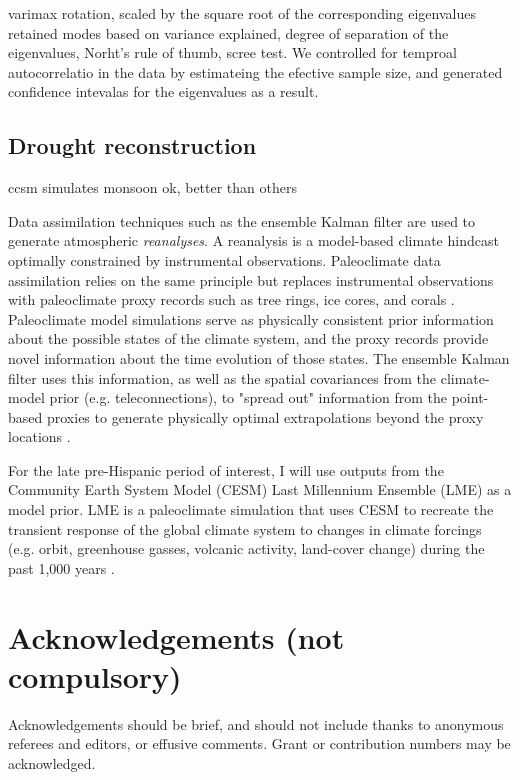 \documentclass[fleqn,10pt]{wlscirep}
\begin{document}
varimax rotation, scaled by the square root of the corresponding eigenvalues
retained modes based on variance explained, degree of separation of the eigenvalues, Norht's rule of thumb, scree test. We controlled for temproal autocorrelatio in the data by estimateing the efective sample size, and generated confidence intevalas for the eigenvalues as a result.

\subsection*{Drought reconstruction}
ccsm simulates monsoon ok, better than others

Data assimilation techniques such as the ensemble Kalman filter are used to generate atmospheric \textit{reanalyses}. A reanalysis is a model-based climate hindcast optimally constrained by instrumental observations. Paleoclimate data assimilation relies on the same principle but replaces instrumental observations with paleoclimate proxy records such as tree rings, ice cores, and corals \cite{Hakim2016TheResults}. Paleoclimate model simulations serve as physically consistent prior information about the possible states of the climate system, and the proxy records provide novel information about the time evolution of those states. The ensemble Kalman filter uses this information, as well as the spatial covariances from the climate-model prior (e.g. teleconnections), to "spread out" information from the point-based proxies to generate physically optimal extrapolations beyond the proxy locations \cite{Acevedo2015TowardsTechniques,Hakim2016TheResults}.

For the late pre-Hispanic period of interest, I will use outputs from the Community Earth System Model (CESM) Last Millennium Ensemble (LME) as a model prior. LME is a paleoclimate simulation that uses CESM to recreate the transient response of the global climate system to changes in climate forcings (e.g. orbit, greenhouse gasses, volcanic activity, land-cover change) during the past 1,000 years \cite{Otto-bliesner2015}.





\section*{Acknowledgements (not compulsory)}

Acknowledgements should be brief, and should not include thanks to anonymous referees and editors, or effusive comments. Grant or contribution numbers may be acknowledged.
\end{document}
